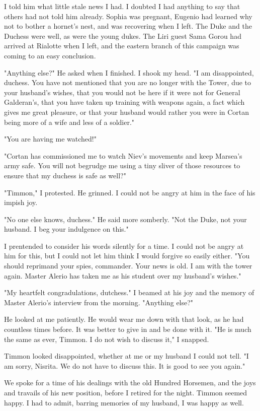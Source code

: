 \documentclass{article}
\begin{document}
I told him what little stale news I had. I doubted I had anything to say that others had not told him already. Sophia was pregnant, Eugenio had learned why not to bother a hornet's nest, and was recovering when I left. The Duke and the Duchess were well, as were the young dukes. The Liri guest Sama Gorou had arrived at Rialotte when I left, and the eastern branch of this campaign was coming to an easy conclusion. 

"Anything else?" He asked when I finished. I shook my head. "I am disappointed, duchess. You have not mentioned that you are no longer with the Tower, due to your husband's wishes, that you would not be here if it were not for General Galderan's, that you have taken up training with weapons again, a fact which gives me great pleasure, or that your husband would rather you were in Cortan being more of a wife and less of a soldier."

"You are having me watched!"

"Cortan has commissioned me to watch Niev's movements and keep Marsea's army safe. You will not begrudge me using a tiny sliver of those resources to ensure that my duchess is safe as well?"

"Timmon," I protested. He grinned. I could not be angry at him in the face of his impish joy. 

"No one else knows, duchess." He said more somberly. "Not the Duke, not your husband. I beg your indulgence on this."

I prentended to consider his words silently for a time. I could not be angry at him for this, but I could not let him think I would forgive so easily either. "You should reprimand your spies, commander. Your news is old. I am with the tower again. Master Alerio has taken me as his student over my husband's wishes."

"My heartfelt congradulations, dutchess." I beamed at his joy and the memory of Master Alerio's interview from the morning. "Anything else?"

He looked at me patiently. He would wear me down with that look, as he had countless times before. It was better to give in and be done with it. "He is much the same as ever, Timmon. I do not wish to discuss it," I snapped.

Timmon looked disappointed, whether at me or my husband I could not tell. "I am sorry, Nisrita. We do not have to discuss this. It is good to see you again."

We spoke for a time of his dealings with the old Hundred Horsemen, and the joys and travails of his new position, before I retired for the night. Timmon seemed happy. I had to admit, barring memories of my husband, I was happy as well.
\end{document}
